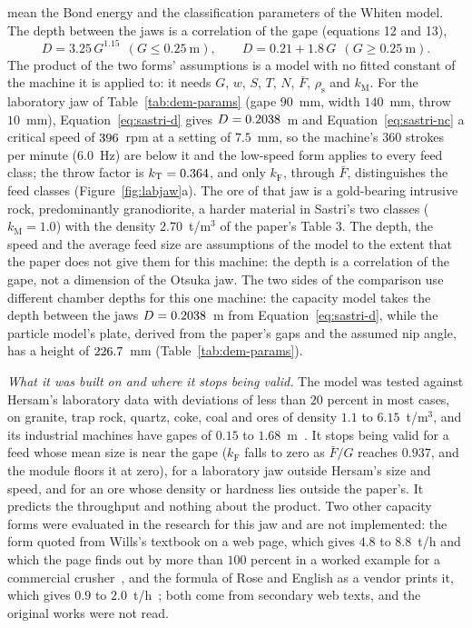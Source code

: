 mean the Bond energy and the classification parameters of the Whiten model. The depth between the jaws is a correlation of the gape (equations 12 and 13),
\begin{equation}
D=3.25\,G^{1.15}\ \ (G\le0.25\ \mathrm m),\qquad D=0.21+1.8\,G\ \ (G\ge0.25\ \mathrm m).
\label{eq:sastri-d}
\end{equation}
The product of the two forms' assumptions is a model with no fitted constant of the machine it is applied to: it needs $G$, $w$, $S$, $T$, $N$, $\bar F$, $\rho_{\mathrm s}$ and $k_{\mathrm M}$. For the laboratory jaw of Table~\ref{tab:dem-params} (gape $90$~mm, width $140$~mm, throw $10$~mm), Equation~\eqref{eq:sastri-d} gives $D=0.2038$~m and Equation~\eqref{eq:sastri-nc} a
critical speed of $396$~rpm at a setting of $7.5$~mm, so the machine's $360$ strokes per minute ($6.0$~Hz) are below it and the low-speed form applies to every feed class; the throw factor is $k_{\mathrm T}=0.364$, and only $k_{\mathrm F}$, through $\bar F$, distinguishes the feed classes (Figure~\ref{fig:labjaw}a). The ore of that jaw is a gold-bearing intrusive rock, predominantly granodiorite, a harder material in Sastri's two classes ($k_{\mathrm M}=1.0$) with the density $2.70$~t/m$^3$ of the paper's Table 3. The depth, the speed and the average feed size are assumptions of the model to the extent that the paper does not give them for this machine: the depth is a correlation of the gape, not a dimension of the Otsuka jaw. The two sides of the comparison use different chamber depths for this one machine: the capacity model takes the depth between the jaws $D=0.2038$~m from Equation~\eqref{eq:sastri-d}, while the particle model's plate, derived from the paper's gaps and the assumed nip angle, has a height of $226.7$~mm (Table~\ref{tab:dem-params}).

\emph{What it was built on and where it stops being valid.} The model was tested against Hersam's laboratory data with deviations of less than $20$ percent in most cases, on granite, trap rock, quartz, coke, coal and ores of density $1.1$ to $6.15$~t/m$^3$, and its industrial machines have gapes of $0.15$ to $1.68$~m~\cite{sastri1994}. It stops being valid for a feed whose mean size is near the gape ($k_{\mathrm F}$ falls to zero as $\bar F/G$ reaches $0.937$, and the module floors it at zero),
for a laboratory jaw outside Hersam's size and speed, and for an ore whose density or hardness lies outside the paper's. It predicts the throughput and nothing about the product. Two other capacity forms were evaluated in the research for this jaw and are not implemented: the form quoted from Wills's textbook on a web page, which gives $4.8$ to $8.8$~t/h and which the page finds out by more than $100$ percent in a worked example for a commercial crusher~\cite{wills911}, and the formula of Rose and English as a vendor prints it, which gives $0.9$ to $2.0$~t/h~\cite{meka}; both come from secondary web texts, and the original works were not read.

